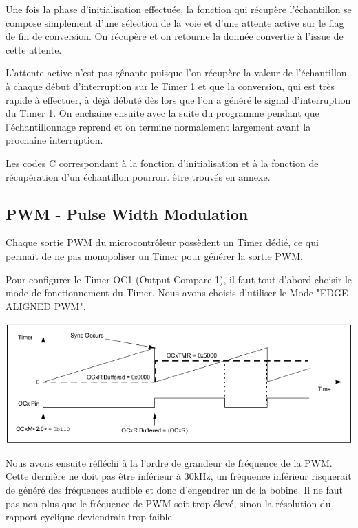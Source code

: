 \documentclass[11pt, french]{article} %
\begin{document}
\vspace{0.5cm}

Une fois la phase d'initialisation effectuée, la fonction qui récupère l'échantillon se compose simplement d'une sélection de la voie et d'une attente active sur le flag de fin de conversion. On récupère et on retourne la donnée convertie à l'issue de cette attente. 

\vspace{0.5cm}

L'attente active n'est pas gênante puisque l'on récupère la valeur de l'échantillon à chaque début d'interruption sur le Timer 1 et que la conversion, qui est très rapide à effectuer, à déjà débuté dès lors que l'on a généré le signal d'interruption du Timer 1. On enchaine ensuite avec la suite du programme pendant que l'échantillonnage reprend et on termine normalement largement avant la prochaine interruption.

\vspace{0.5cm}

Les codes C correspondant à la fonction d'initialisation et à la fonction de récupération d'un échantillon pourront être trouvés en annexe. 

\subsection{PWM - Pulse Width Modulation}

Chaque sortie PWM du microcontrôleur possèdent un Timer dédié, ce qui permait de ne pas monopoliser un Timer pour générer la sortie PWM.

Pour configurer le Timer OC1 (Output Compare 1), il faut tout d'abord choisir le mode de fonctionnement du Timer. Nous avons choisis d'utiliser le Mode "EDGE-ALIGNED PWM".

\begin{center}
\includegraphics[width = 15cm]{SolutionAnalogique/PWMMode.png} 
\end{center}

Nous avons ensuite réfléchi à la l'ordre de grandeur de fréquence de la PWM. Cette dernière ne doit pas être inférieur à 30kHz, un fréquence inférieur risquerait de généré des fréquences audible et donc d'engendrer un  de la bobine. Il ne faut pas non plus que le fréquence de PWM soit trop élevé, sinon la résolution du rapport cyclique deviendrait trop faible.
\end{document}
